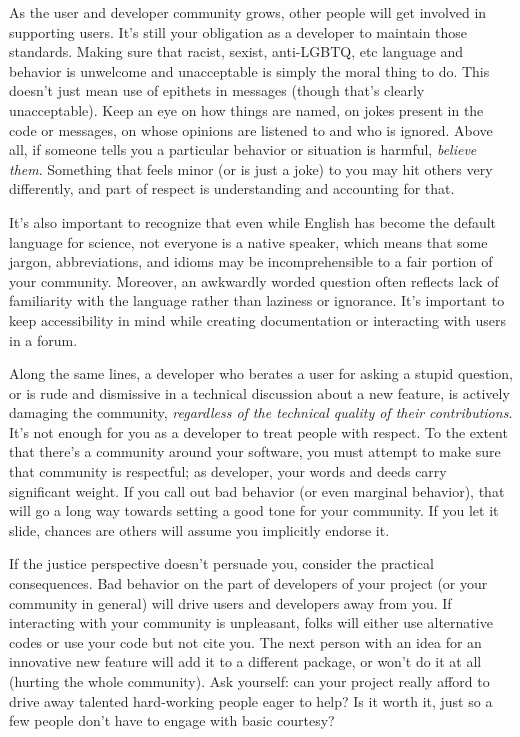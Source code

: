 \documentclass[9pt,training]{livecoms}
\begin{document}
As the user and developer community grows, other people will get involved in
supporting users. It's still your obligation as a developer to maintain those
standards.  Making sure that racist, sexist, anti-LGBTQ, etc language and
behavior is unwelcome and unacceptable is simply the moral thing to do.  This
doesn't just mean use of epithets in messages (though that's clearly
unacceptable). Keep an eye on how things are named, on jokes present in the code
or messages, on whose opinions are listened to and who is ignored.  Above all,
if someone tells you a particular behavior or situation is harmful,
\emph{believe them}.  Something that feels minor (or is just a joke) to you may
hit others very differently, and part of respect is understanding and accounting
for that.

It's also important to recognize that even while English has become the default
language for science, not everyone is a native speaker, which means that some
jargon, abbreviations, and idioms may be incomprehensible to a fair portion of
your community. Moreover, an awkwardly worded question often reflects lack of
familiarity with the language rather than laziness or ignorance. It's important
to keep accessibility in mind while creating documentation or interacting with
users in a forum.

Along the same lines, a developer who berates a user for asking a stupid
question, or is rude and dismissive in a technical discussion about a new
feature, is actively damaging the community, \emph{regardless of the technical
quality of their contributions.} It's not enough for you as a developer to treat
people with respect.  To the extent that there's a community around your
software, you must attempt to make sure that community is respectful; as
developer, your words and deeds carry significant weight. If you call out bad
behavior (or even marginal behavior), that will go a long way towards setting a
good tone for your community. If you let it slide, chances are others will
assume you implicitly endorse it.

If the justice perspective doesn't persuade you, consider the practical
consequences. Bad behavior on the part of developers of your project (or your
community in general) will drive users and developers away from you. If
interacting with your community is unpleasant, folks will either use alternative
codes or use your code but not cite you. The next person with an idea for an
innovative new feature will add it to a different package, or won't do it at all
(hurting the whole community). Ask yourself: can your project really afford to
drive away talented hard-working people eager to help? Is it worth it, just so a
few people don't have to engage with basic courtesy?
\end{document}
